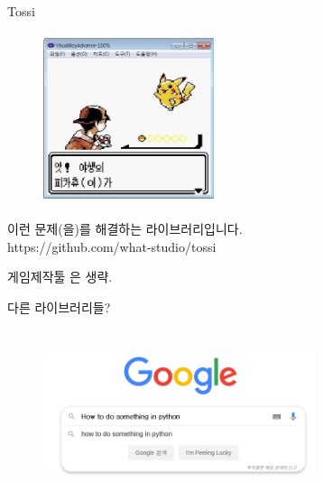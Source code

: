 \documentclass{beamer}
\begin{document}
\begin{frame}{Tossi}
\begin{figure}[H]
  \centering
  \includegraphics[width=50mm,height=50mm]{poke.jpg}
\end{figure}
이런 문제(을)를 해결하는 라이브러리입니다.\\
https://github.com/what-studio/tossi
\end{frame}

\begin{frame}{게임제작툴}
은 생략.
\end{frame}

\begin{frame}{다른 라이브러리들?}
\begin{figure}[H]
  \centering
  \includegraphics[width=80mm,height=50mm]{google.png}
\end{figure}
\end{frame}
\end{document}
